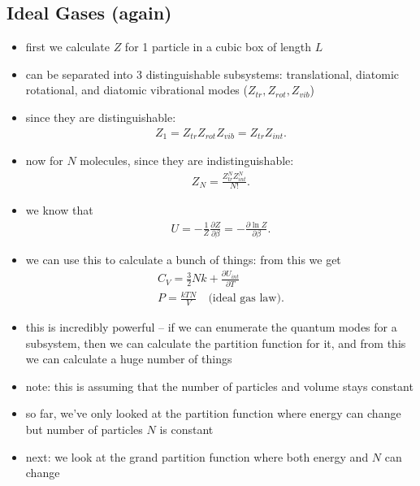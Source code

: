 \documentclass[10pt]{article}
\begin{document}
\subsection{Ideal Gases (again)}
\begin{itemize}
    \item first we calculate $Z$ for 1 particle in a cubic box of length $L$ 
    \item can be separated into 3 distinguishable subsystems: translational, diatomic rotational, and diatomic vibrational modes ($Z_{tr}, Z_{rot}, Z_{vib}$)
    \item since they are distinguishable:
        \begin{gather*}
            Z_1 = Z_{tr}Z_{rot}Z_{vib} = Z_{tr}Z_{int}
        .\end{gather*}
    \item now for $N$ molecules, since they are indistinguishable:
        \begin{gather*}
            Z_N = \frac{Z_{tr}^N Z_{int}^N}{N!}
        .\end{gather*}
    \item we know that 
        \begin{gather*}
            U = -\frac{1}{Z} \frac{\partial Z}{\partial \beta} = - \frac{\partial \ln Z}{\partial \beta} 
        .\end{gather*}
    \item we can use this to calculate a bunch of things: from this we get 
        \begin{gather*}
            C_V = \frac{3}{2}Nk + \frac{\partial U_{int}}{\partial T} \\ 
            P = \frac{kTN}{V} \quad \text{(ideal gas law)}
        .\end{gather*}
    \item this is incredibly powerful -- if we can enumerate the quantum modes for a subsystem, then we can calculate the partition function for it, and from this we can calculate a huge number of things
    \item note: this is assuming that the number of particles and volume stays constant
    \item so far, we've only looked at the partition function where energy can change but number of particles $N$ is constant 
    \item next: we look at the grand partition function where both energy and $N$ can change
\end{itemize}
\end{document}
